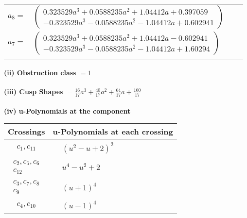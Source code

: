 \documentclass[1p]{elsarticle_modified}
\theoremstyle{definition}
\begin{document}
\begin{tabular}{m{7pt} m{180pt} m{7pt} m{180pt} }
\flushright $a_{8}=$&$\begin{pmatrix}0.323529 a^{3}+0.0588235 a^{2}+1.04412 a+0.397059\\-0.323529 a^{3}-0.0588235 a^{2}-1.04412 a+0.602941\end{pmatrix}$ \\
\flushright $a_{7}=$&$\begin{pmatrix}0.323529 a^{3}+0.0588235 a^{2}+1.04412 a-0.602941\\-0.323529 a^{3}-0.0588235 a^{2}-1.04412 a+1.60294\end{pmatrix}$\\&\end{tabular}
\flushleft \textbf{(ii) Obstruction class $= 1$}\\~\\
\flushleft \textbf{(iii) Cusp Shapes $= \frac{16}{17} a^3+\frac{40}{17} a^2+\frac{64}{17} a+\frac{100}{17}$}\\~\\
\newpage\renewcommand{\arraystretch}{1}
\flushleft \textbf{(iv) u-Polynomials at the component}\newline \\
\begin{tabular}{m{50pt}|m{274pt}}
Crossings & \hspace{64pt}u-Polynomials at each crossing \\
\hline $$\begin{aligned}c_{1},c_{11}\end{aligned}$$&$\begin{aligned}
&(u^2- u+2)^2
\end{aligned}$\\
\hline $$\begin{aligned}c_{2},c_{5},c_{6}\\c_{12}\end{aligned}$$&$\begin{aligned}
&u^4- u^2+2
\end{aligned}$\\
\hline $$\begin{aligned}c_{3},c_{7},c_{8}\\c_{9}\end{aligned}$$&$\begin{aligned}
&(u+1)^4
\end{aligned}$\\
\hline $$\begin{aligned}c_{4},c_{10}\end{aligned}$$&$\begin{aligned}
&(u-1)^4
\end{aligned}$\\
\hline
\end{tabular}\\~\\
\end{document}
